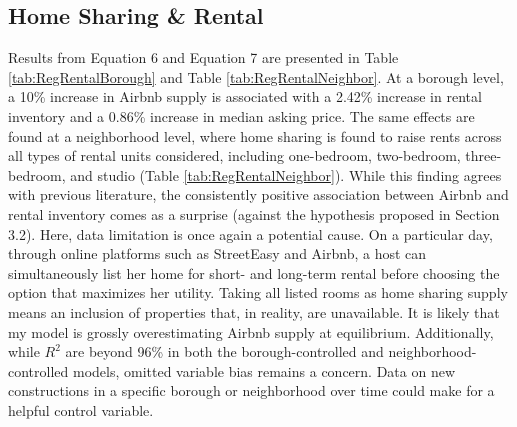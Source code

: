 \documentclass[12pt]{article}
\begin{document}
		\subsection{Home Sharing \& Rental}
			Results from Equation 6 and Equation 7 are presented in Table \ref{tab:RegRentalBorough} and Table \ref{tab:RegRentalNeighbor}. At a borough level, a 10\% increase in Airbnb supply is associated with a 2.42\% increase in rental inventory and a 0.86\% increase in median asking price. The same effects are found at a neighborhood level, where home sharing is found to raise rents across all types of rental units considered, including one-bedroom, two-bedroom, three-bedroom, and studio (Table \ref{tab:RegRentalNeighbor}). While this finding agrees with previous literature, the consistently positive association between Airbnb and rental inventory comes as a surprise (against the hypothesis proposed in Section 3.2). Here, data limitation is once again a potential cause. On a particular day, through online platforms such as StreetEasy and Airbnb, a host can simultaneously list her home for short- and long-term rental before choosing the option that maximizes her utility. Taking all listed rooms as home sharing supply means an inclusion of properties that, in reality, are unavailable. It is likely that my model is grossly overestimating Airbnb supply at equilibrium. Additionally, while $R^2$ are beyond 96\% in both the borough-controlled and neighborhood-controlled models, omitted variable bias remains a concern. Data on new constructions in a specific borough or neighborhood over time could make for a helpful control variable.
			
\end{document}
